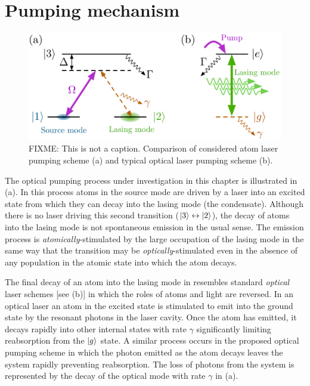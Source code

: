 \section{Pumping mechanism}
\label{OpticalPumping:PumpingMechanism}

\begin{figure}
    \centering
    \includegraphics[width=14cm]{LambdaModel}
    \caption{FIXME: This is not a caption. Comparison of considered atom laser pumping scheme (a) and typical optical laser pumping scheme (b).\label{OpticalPumping:LambdaModel}}
\end{figure}

The optical pumping process under investigation in this chapter is illustrated in (a).  In this process atoms in the source mode are driven by a laser into an excited state from which they can decay into the lasing mode (the condensate).  Although there is no laser driving this second transition (${\left|3\right>}\leftrightarrow{\ensuremath{\left|2\right>}}$), the decay of atoms into the lasing mode is not spontaneous emission in the usual sense.  The emission process is \emph{atomically}-stimulated by the large occupation of the lasing mode in the same way that the transition may be \emph{optically}-stimulated even in the absence of any population in the atomic state into which the atom decays.

The final decay of an atom into the lasing mode in  resembles standard \emph{optical} laser schemes [see (b)] in which the roles of atoms and light are reversed.  In an optical laser an atom in the excited state is stimulated to emit into the ground state by the resonant photons in the laser cavity.  Once the atom has emitted, it decays rapidly into other internal states with rate $\gamma$ significantly limiting reabsorption from the ${\left|g\right>}$ state.  A similar process occurs in the proposed optical pumping scheme in which the photon emitted as the atom decays  leaves the system rapidly preventing reabsorption.  The loss of photons from the system is represented by the decay of the optical mode with rate $\gamma$ in (a).

